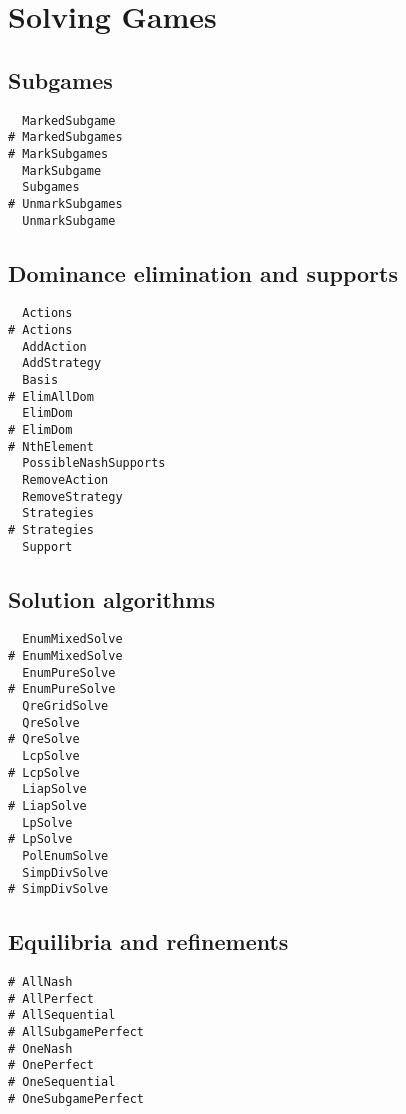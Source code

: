 \section{Solving Games}

\subsection{Subgames}

\begin{multicols}{3}
\begin{verbatim}
  MarkedSubgame 
# MarkedSubgames 
# MarkSubgames 
  MarkSubgame 
  Subgames 
# UnmarkSubgames 
  UnmarkSubgame 
\end{verbatim}
\end{multicols}

\subsection{Dominance elimination and supports}

\begin{multicols}{3}
\begin{verbatim}
  Actions
# Actions
  AddAction
  AddStrategy
  Basis
# ElimAllDom 
  ElimDom 
# ElimDom 
# NthElement
  PossibleNashSupports
  RemoveAction
  RemoveStrategy
  Strategies 
# Strategies 
  Support 
\end{verbatim}
\end{multicols}

\subsection{Solution algorithms}

\begin{multicols}{3}
\begin{verbatim}
  EnumMixedSolve 
# EnumMixedSolve 
  EnumPureSolve 
# EnumPureSolve 
  QreGridSolve 
  QreSolve 
# QreSolve 
  LcpSolve 
# LcpSolve 
  LiapSolve 
# LiapSolve 
  LpSolve 
# LpSolve 
  PolEnumSolve
  SimpDivSolve 
# SimpDivSolve 
\end{verbatim}
\end{multicols}

\subsection{Equilibria and refinements}

\begin{multicols}{3}
\begin{verbatim}
# AllNash
# AllPerfect
# AllSequential 
# AllSubgamePerfect
# OneNash
# OnePerfect
# OneSequential
# OneSubgamePerfect
\end{verbatim}
\end{multicols}

